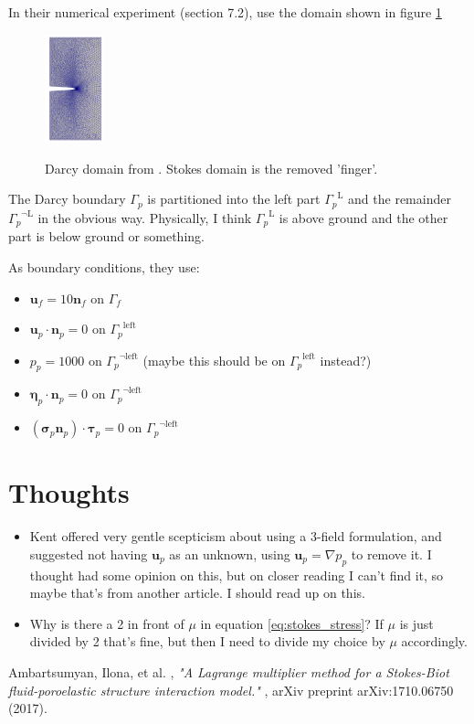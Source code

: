\documentclass{article}
\newcommand{\mathspace}[1]{\ensuremath{#1}\xspace} %
\newcommand{\sigmabf}{\mathspace{\boldsymbol{\sigma}}}
\newcommand{\grad}{\mathspace{\nabla}}
\newcommand{\taubf}{\mathspace{\boldsymbol{\tau}}}
\newcommand{\stokesbdy}{\mathspace{\Gamma_{f}}}
\newcommand{\darcybdy}{\mathspace{\Gamma_{p}}}
\newcommand{\nf}{\mathspace{\mathbf{n}_f}}
\newcommand{\np}{\mathspace{\mathbf{n}_p}}
\newcommand{\uf}{\mathspace{\mathbf{u}_f}}
\newcommand{\up}{\mathspace{\mathbf{u}_p}}
\newcommand{\pp}{\mathspace{p_p}}
\newcommand{\disp}{\mathspace{\boldsymbol{\eta}_p}}
\begin{document}
In their numerical experiment (section 7.2), \cite{ambartsumyan} use the domain shown in figure \ref{fig:ambartsumyandomain}
\begin{figure}[h]
  \centering
  \includegraphics[width=0.15\textwidth]{img/ambartsumyandomain.png}
  \label{fig:ambartsumyandomain}
  \caption{Darcy domain from \cite{ambartsumyan}. Stokes domain is the removed 'finger'.}
\end{figure}
The Darcy boundary \darcybdy is partitioned into the left part $\darcybdy^{\text{L}}$ and the remainder $\darcybdy^{\neg \text{L}}$ in the obvious way. Physically, I think $\darcybdy^{\text{L}}$ is above ground and the other part is below ground or something.

As boundary conditions, they use:
\begin{itemize}
\item $\uf = 10 \nf$ on \stokesbdy
\item $\up \cdot \np = 0$ on $\darcybdy^{\text{left}}$
\item $\pp = 1000$ on $\darcybdy^{\neg \text{left}}$ (maybe this should be on $\darcybdy^{\text{left}}$ instead?)
\item $\disp \cdot \np = 0$ on $\darcybdy^{\neg \text{left}}$
\item $(\sigmabf_p \np) \cdot \taubf_p = 0$ on $\darcybdy^{\neg \text{left}}$


 
\end{itemize}



\section{Thoughts}
\begin{itemize}
\item Kent offered very gentle scepticism about using a 3-field formulation, and suggested not having \up as an unknown, using $\up = \grad \pp$ to remove it. I thought \cite{ambartsumyan} had some opinion on this, but on closer reading I can't find it, so maybe that's from another article. I should read up on this.

\item Why is there a 2 in front of $\mu$ in equation \eqref{eq:stokes_stress}? If $\mu$ is just divided by 2 that's fine, but then I need to divide my choice by $\mu$ accordingly.

   
 
\end{itemize}



\begin{thebibliography}{99}
{\sc Ambartsumyan, Ilona, et al. }, {\em "A Lagrange multiplier method for a Stokes-Biot fluid-poroelastic structure interaction model." }, arXiv preprint arXiv:1710.06750 (2017).
  
\end{thebibliography}
\end{document}
